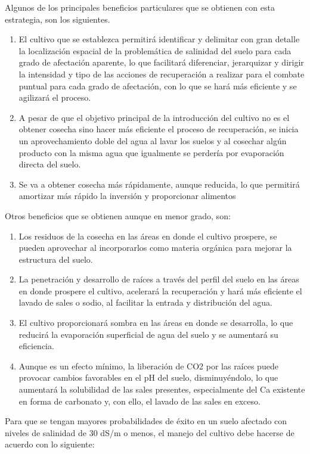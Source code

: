 Algunos de los principales beneficios particulares que se obtienen con esta estrategia, son los siguientes.
\begin{enumerate}
    \item El cultivo que se establezca permitirá identificar y delimitar con gran detalle la localización espacial de la problemática de salinidad del suelo para cada grado de afectación aparente, lo que facilitará diferenciar, jerarquizar y dirigir la intensidad y tipo de las acciones de recuperación a realizar para el combate puntual para cada grado de afectación, con lo que se hará más eficiente y se agilizará el proceso.
    \item A pesar de que el objetivo principal de la introducción del cultivo no es el obtener cosecha sino hacer más eficiente el proceso de recuperación, se inicia un aprovechamiento doble del agua al lavar los suelos y al cosechar algún producto con la misma agua que igualmente se perdería por evaporación directa del suelo.
    \item Se va a obtener cosecha más rápidamente, aunque reducida, lo que permitirá amortizar más rápido la inversión y proporcionar alimentos
\end{enumerate}
Otros beneficios que se obtienen aunque en menor grado, son:
\begin{enumerate}
    \item Los residuos de la cosecha en las áreas en donde el cultivo prospere, se pueden aprovechar al incorporarlos como materia orgánica para mejorar la estructura del suelo.
    \item La penetración y desarrollo de raíces a través del perfil del suelo en las áreas en donde prospere el cultivo, acelerará la recuperación y hará más eficiente el lavado de sales o sodio, al facilitar la entrada y distribución del agua.
    \item El cultivo proporcionará sombra en las áreas en donde se desarrolla, lo que reducirá la evaporación superficial de agua del suelo y se aumentará su eficiencia.
    \item Aunque es un efecto mínimo, la liberación de CO2 por las raíces puede provocar cambios favorables en el pH del suelo, disminuyéndolo, lo que aumentará la solubilidad de las sales presentes, especialmente del Ca existente en forma de carbonato y, con ello, el lavado de las sales en exceso.
\end{enumerate}
Para que se tengan mayores probabilidades de éxito en un suelo afectado con niveles de salinidad de 30 dS/m o menos, el manejo del cultivo debe hacerse de acuerdo con lo siguiente:
